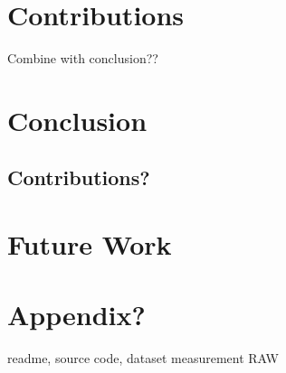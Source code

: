 \documentclass[USenglish]{uit-thesis}
\begin{document}
\chapter{Contributions}
Combine with conclusion??
\chapter{Conclusion}
\section{Contributions?}

\chapter{Future Work}

\chapter{Appendix?}
readme, source code, dataset measurement RAW
\backmatter



\newpage{}
\end{document}
